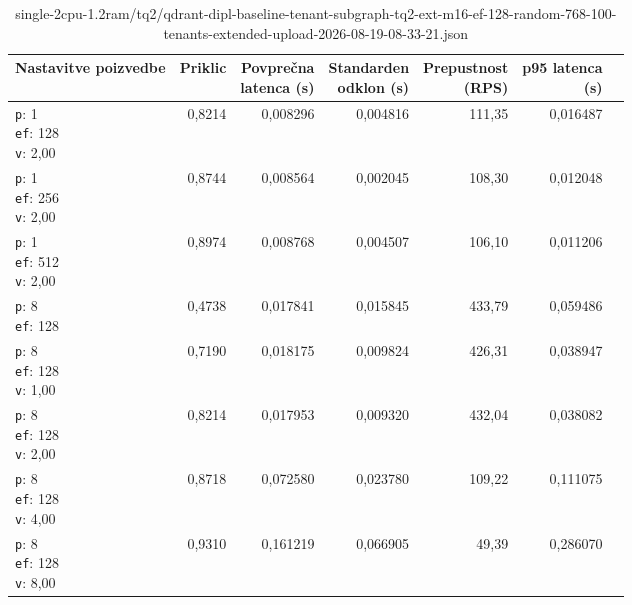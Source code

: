 \begin{table}[htbp]
  \centering
\small
  \caption{single-2cpu-1.2ram/tq2/qdrant-dipl-baseline-tenant-subgraph-tq2-ext-m16-ef-128-random-768-100-tenants-extended-upload-2026-08-19-08-33-21.json}
  \label{tab:single-2cpu-1.2ram:tq2:qdrant-dipl-baseline-tenant-subgraph-tq2-ext-m16-ef-128-random-768-100-tenants-extended-upload-2026-08-19-08-33-21.json}
  \begin{tabularx}{\textwidth}{Xrrrrrr}
    \toprule
    Nastavitve poizvedbe & Priklic & \makecell{Povprečna\\latenca (s)} & \makecell{Standarden\\odklon (s)} & \makecell{Prepustnost\\(RPS)} & \makecell{p95 latenca\\(s)}  \\
    \midrule
    \makecell{\texttt{p}: 1\\\texttt{ef}: 128\\\texttt{v}: 2,00} & 0,8214 & 0,008296 & 0,004816 & 111,35 & 0,016487 \\
    \makecell{\texttt{p}: 1\\\texttt{ef}: 256\\\texttt{v}: 2,00} & 0,8744 & 0,008564 & 0,002045 & 108,30 & 0,012048 \\
    \makecell{\texttt{p}: 1\\\texttt{ef}: 512\\\texttt{v}: 2,00} & 0,8974 & 0,008768 & 0,004507 & 106,10 & 0,011206 \\
    \makecell{\texttt{p}: 8\\\texttt{ef}: 128} & 0,4738 & 0,017841 & 0,015845 & 433,79 & 0,059486 \\
    \makecell{\texttt{p}: 8\\\texttt{ef}: 128\\\texttt{v}: 1,00} & 0,7190 & 0,018175 & 0,009824 & 426,31 & 0,038947 \\
    \makecell{\texttt{p}: 8\\\texttt{ef}: 128\\\texttt{v}: 2,00} & 0,8214 & 0,017953 & 0,009320 & 432,04 & 0,038082 \\
    \makecell{\texttt{p}: 8\\\texttt{ef}: 128\\\texttt{v}: 4,00} & 0,8718 & 0,072580 & 0,023780 & 109,22 & 0,111075 \\
    \makecell{\texttt{p}: 8\\\texttt{ef}: 128\\\texttt{v}: 8,00} & 0,9310 & 0,161219 & 0,066905 & 49,39 & 0,286070 \\

\end{tabularx}
\end{table}
